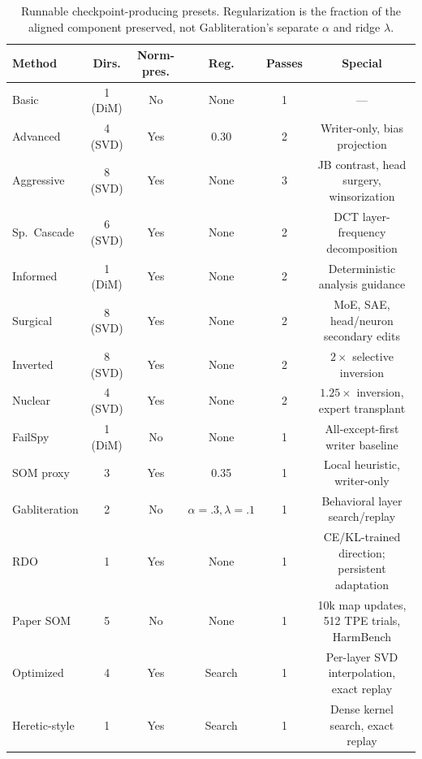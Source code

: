 \documentclass[11pt]{article}
\begin{document}
\begin{table}[h]
\centering
\caption{Runnable checkpoint-producing presets. Regularization is the fraction of the aligned component preserved, not Gabliteration's separate $\alpha$ and ridge $\lambda$.}
\label{tab:methods}
\small
\begin{tabular}{@{}lccccc@{}}
\toprule
\textbf{Method} & \textbf{Dirs.} & \textbf{Norm-pres.} & \textbf{Reg.} & \textbf{Passes} & \textbf{Special} \\
\midrule
Basic & 1 (DiM) & No & None & 1 & --- \\
Advanced & 4 (SVD) & Yes & 0.30 & 2 & Writer-only, bias projection \\
Aggressive & 8 (SVD) & Yes & None & 3 & JB contrast, head surgery, winsorization \\
Sp.\ Cascade & 6 (SVD) & Yes & None & 2 & DCT layer-frequency decomposition \\
Informed & 1 (DiM) & Yes & None & 2 & Deterministic analysis guidance \\
Surgical & 8 (SVD) & Yes & None & 2 & MoE, SAE, head/neuron secondary edits \\
Inverted & 8 (SVD) & Yes & None & 2 & $2\times$ selective inversion \\
Nuclear & 4 (SVD) & Yes & None & 2 & $1.25\times$ inversion, expert transplant \\
FailSpy & 1 (DiM) & No & None & 1 & All-except-first writer baseline \\
SOM proxy & 3 & Yes & 0.35 & 1 & Local heuristic, writer-only \\
Gabliteration & 2 & No & $\alpha=.3,\lambda=.1$ & 1 & Behavioral layer search/replay \\
RDO & 1 & Yes & None & 1 & CE/KL-trained direction; persistent adaptation \\
Paper SOM & 5 & No & None & 1 & 10k map updates, 512 TPE trials, HarmBench \\
Optimized & 4 & Yes & Search & 1 & Per-layer SVD interpolation, exact replay \\
Heretic-style & 1 & Yes & Search & 1 & Dense kernel search, exact replay \\
\bottomrule
\end{tabular}
\end{table}
\end{document}
